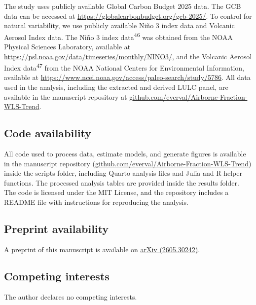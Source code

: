 \documentclass[
  12pt,
  letterpaper,
  DIV=11,
  numbers=noendperiod]{scrartcl}
\begin{document}
The study uses publicly available Global Carbon Budget 2025 data. The
GCB data can be accessed at
\url{https://globalcarbonbudget.org/gcb-2025/}. To control for natural
variability, we use publicly available Niño 3 index data and Volcanic
Aerosol Index data. The Niño 3 index data\textsuperscript{46} was
obtained from the NOAA Physical Sciences Laboratory, available at
\url{https://psl.noaa.gov/data/timeseries/monthly/NINO3/}, and the
Volcanic Aerosol Index data\textsuperscript{47} from the NOAA National
Centers for Environmental Information, available at
\url{https://www.ncei.noaa.gov/access/paleo-search/study/5786}. All data
used in the analysis, including the extracted and derived LULC panel,
are available in the manuscript repository at
\href{https://github.com/everval/Airborne-Fraction-WLS-Trend}{github.com/everval/Airborne-Fraction-WLS-Trend}.

\subsection*{Code availability}\label{code-availability}

All code used to process data, estimate models, and generate figures is
available in the manuscript repository
(\href{https://github.com/everval/Airborne-Fraction-WLS-Trend}{github.com/everval/Airborne-Fraction-WLS-Trend})
inside the scripts folder, including Quarto analysis files and Julia and
R helper functions. The processed analysis tables are provided inside
the results folder. The code is licensed under the MIT License, and the
repository includes a README file with instructions for reproducing the
analysis.

\subsection*{Preprint availability}\label{preprint-availability}

A preprint of this manuscript is available on
\href{https://arxiv.org/abs/2605.30242}{arXiv (2605.30242)}.

\subsection*{Competing interests}\label{competing-interests}

The author declares no competing interests.
\end{document}
